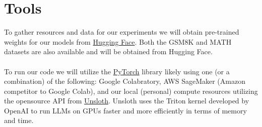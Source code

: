 \section{Tools}

To gather resources and data for our experiments we will obtain pre-trained weights for our models from \href{https://huggingface.co/}{Hugging Face}. Both the GSM8K and MATH datasets are also available and will be obtained from Hugging Face.
\\\\
To run our code we will utilize the \href{https://pytorch.org/}{PyTorch} library likely using one (or a combination) of the following: Google Colabratory, AWS SageMaker (Amazon competitor to Google Colab), and our local (personal) compute resources utilizing the opensource API from \href{https://unsloth.ai/}{Unsloth}. Unsloth uses the Triton kernel developed by OpenAI to run LLMs on GPUs faster and more efficiently in terms of memory and time.


